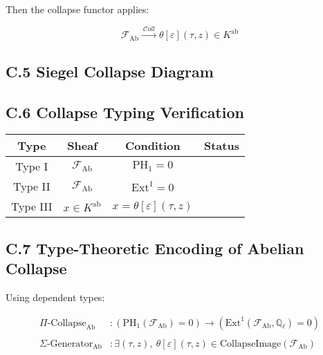 \documentclass[11pt]{article}
\newcommand{\cmark}{\ding{51}}  %
\begin{document}
Then the collapse functor applies:

\[
\mathcal{F}_{\mathrm{Ab}} \xrightarrow{\ \mathcal{C}oll\ } \theta[\varepsilon](\tau, z) \in K^{\mathrm{ab}}
\]

\subsection*{C.5 Siegel Collapse Diagram}

\begin{center}
\end{center}

\subsection*{C.6 Collapse Typing Verification}

\begin{center}
\renewcommand{\arraystretch}{1.2}
\begin{tabular}{|c|c|c|c|}
\hline
\textbf{Type} & \textbf{Sheaf} & \textbf{Condition} & \textbf{Status} \\
\hline
Type I & \( \mathcal{F}_{\mathrm{Ab}} \) & \( \mathrm{PH}_1 = 0 \) & \cmark \\
Type II & \( \mathcal{F}_{\mathrm{Ab}} \) & \( \mathrm{Ext}^1 = 0 \) & \cmark \\
Type III & \( x \in K^{\mathrm{ab}} \) & \( x = \theta[\varepsilon](\tau, z) \) & \cmark \\
\hline
\end{tabular}
\end{center}

\subsection*{C.7 Type-Theoretic Encoding of Abelian Collapse}

Using dependent types:

\begin{align*}
\Pi\text{-Collapse}_{\mathrm{Ab}} &\colon \left( \mathrm{PH}_1(\mathcal{F}_{\mathrm{Ab}}) = 0 \right) \to \left( \mathrm{Ext}^1(\mathcal{F}_{\mathrm{Ab}}, \mathbb{Q}_\ell) = 0 \right) \\\\
\Sigma\text{-Generator}_{\mathrm{Ab}} &\colon \exists (\tau, z),\ \theta[\varepsilon](\tau, z) \in \text{CollapseImage}(\mathcal{F}_{\mathrm{Ab}})
\end{align*}
\end{document}
